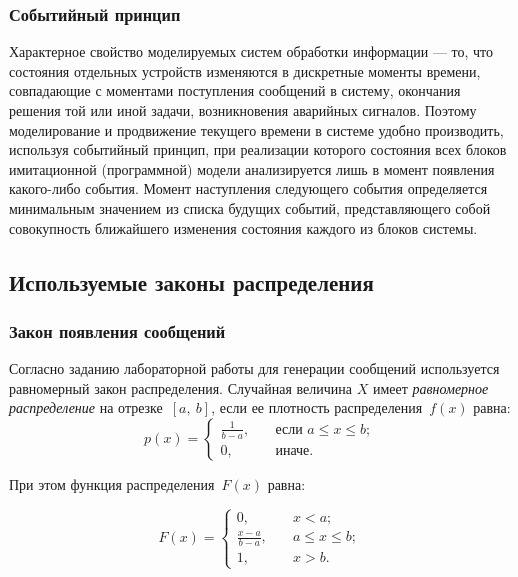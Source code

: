 \subsubsection*{Событийный принцип}

Характерное свойство моделируемых систем обработки информации --- то, что состояния отдельных устройств изменяются в дискретные моменты времени, совпадающие с моментами поступления сообщений в систему, окончания решения той или иной задачи, возникновения аварийных сигналов. Поэтому моделирование и продвижение текущего времени в системе удобно производить, используя событийный принцип, при реализации которого состояния всех блоков имитационной (программной) модели анализируется лишь в момент появления какого-либо события. 
Момент наступления следующего события определяется минимальным значением из списка будущих событий, представляющего собой совокупность ближайшего изменения состояния каждого из блоков системы.

\subsection{Используемые законы распределения}

\subsubsection*{Закон появления сообщений}

Согласно заданию лабораторной работы для генерации сообщений используется равномерный закон распределения.
Случайная величина $X$ имеет \textit{равномерное распределение} на отрезке~$[a,~b]$, если ее плотность распределения~$f(x)$ равна:
\begin{equation}
	p(x) =
	\begin{cases}
		\displaystyle\frac{1}{b - a}, & \quad \text{если } a \leq x \leq b;\\
		0,  & \quad \text{иначе}.
	\end{cases}
\end{equation}

При этом функция распределения~$F(x)$ равна:

\begin{equation}
	F(x) =
	\begin{cases}
		0,  & \quad x < a;\\
		\displaystyle\frac{x - a}{b - a}, & \quad a \leq x \leq b;\\
		1,  & \quad x > b.
	\end{cases}
\end{equation}

